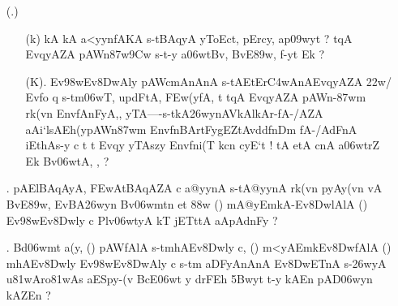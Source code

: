 \begin{itemize}
\item[({\dn \dnnum \rn{14}}.)]\begin{itemize}
                
                \item[({\dn k})] {\dn kA kA a<yynfAKA s\2-tBAqyA yToEct, pErcy, ap\?\309wyt\? {\rs ?\re} t\?qA\2 EvqyAZA\2 pAWn\387w\39Cw\? s\2-t-y a\306wtB\0v, BvE\389w, f-yt\? Ek {\rs ?\re}}
                
                \item[({\dn K}).]{\dn  Ev\398wEv\38DwAly\? pAWcmAnAnA\2 s\2-tAEtEr\3C4wAnA\2\break EvqyAZA\2 \322w\?/ Evfo\- q\? s\2-tm\306wT\4, updFtA, \3FEw(y\2fA, t\?\2 t\?qA\2 EvqyAZA\2 pAWn{\rs -\re}\387wm\? rk(v\?n Env\?fAnFyA,{\rs ,\re} yTA{\rs ----\re}s\2-tkA\326wynAVkAl\2kAr{\rs -\re}\break fA-/AZA aAi`lsAEh(ypAWn\387wm\? Env\?fn\break BArtFygEZtAv\?{\qvb}d\?{\rs -\re}df\0nDm\0\- fA-/AdFnA iEt\-hAs-y c t\? t\? Evqy\? yTAs\2zy\2 Env\?fni(T\2 k\?cn cyE`t {\rs !\re} tA etA\2 cnA a\306wtr\?Z Ek\2 Bv\306wtA, \5, {\rs ?\re}}
              \end{itemize}
              
 \item[{\dn\dnnum \rn{15}}.]  {\dn pAElBAqAyA, \3FEwAtBAqAZA\2 c a@yynA\2 s\2-tA@yynA\2 rk(v\?n pyA\0y(v\?n vA BvE\389w, EvBA\326wyn Bv\306wmt\?n et\? \388w\? {\rs (\re}{\dn\dnnum {}}{\rs )\re} mA@yEmkA{\rs -\re}Ev\38DwlAlA {\rs (\re}{\dn \dnnum {}}{\rs )\re} Ev\398wEv\38Dwly\? c Plv\306wtyA kT\2 jETttA\2 aApAdnFy\? {\rs ?\re}} 
 
 \item[{\dn\dnnum \rn{16}}.] {\dn Bd\306wmt a(y{\rs ,\re} {\rs (\re}{\dn \dnnum {}}{\rs )\re} pAWfAlA s\2-tmhAEv\38Dwly\? c{\rs ,\re} {\rs (\re}{\dn \dnnum {}}{\rs )\re} m<yAEmkEv\38DwfAlA {\rs (\re}{\dn\dnnum {}}{\rs )\re} mhAEv\38Dwly\? Ev\398wEv\38DwAly\? c s\2-tm aDFyAnAnA\2 Ev\38DwET\0nA\2 s\2-\326wyA u\381wAro\381wAs aESpy-(v\2 BcE\306wt y drFEh\- \35Bwyt\?{\rs ,\re} t-y kAEn pAD\306wy\?n kAZ\0En {\rs ?\re} }
 

\end{itemize}

